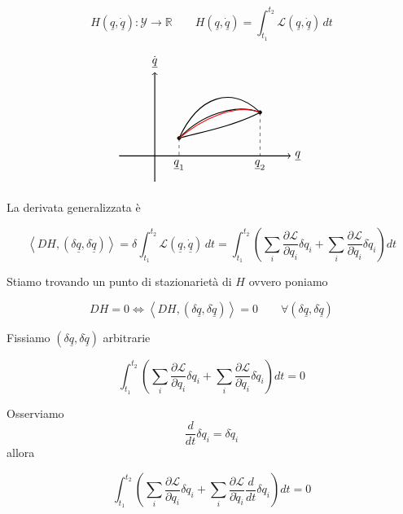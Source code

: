 \[
H(\underline{q},\dot{\underline{q}}):\mathcal{Y}\to\mathbb{R}
\qquad
H(\underline{q},\dot{\underline{q}})
=
\int_{t_1}^{t_2}\mathcal{L}(\underline{q},\dot{\underline{q}})\,dt
\]

\[
\begin{tikzpicture}[scale=1]
  \draw[->, thick] (-1.1,0) -- (4.2,0) node[right] {\(\underline{q}\)};
  \draw[->, thick] (0,-0.8) -- (0,2.6) node[above] {\(\dot{\underline{q}}\)};

  \coordinate (A) at (0.75,0.55);
  \coordinate (B) at (3.25,1.35);

  \filldraw[black] (A) circle (1.5pt);
  \filldraw[black] (B) circle (1.5pt);

  \draw[dashed] (A) -- (0.75,0);
  \draw[dashed] (B) -- (3.25,0);

  \node[below] at (0.75,0) {\(\underline{q}_1\)};
  \node[below] at (3.25,0) {\(\underline{q}_2\)};

  \draw[thick] (A) .. controls (1.35,1.85) and (2.35,2.20) .. (B);
  \draw[thick] (A) .. controls (1.40,1.25) and (2.45,1.65) .. (B);
  \draw[thick] (A) .. controls (1.25,0.70) and (2.40,0.90) .. (B);
  \draw[thick, red] (A) .. controls (1.40,1.10) and (2.45,1.65) .. (B);
\end{tikzpicture}
\]

La derivata generalizzata è

\[
\left\langle DH,(\delta\underline{q},\delta\dot{\underline{q}})\right\rangle
=
\delta \int_{t_1}^{t_2}\mathcal{L}(\underline{q},\dot{\underline{q}})\,dt
=
\int_{t_1}^{t_2}
\left(
\sum_i \frac{\partial \mathcal{L}}{\partial q_i}\delta q_i
+
\sum_i \frac{\partial \mathcal{L}}{\partial \dot{q}_i}\delta\dot{q}_i
\right)dt
\]

Stiamo trovando un punto di stazionarietà di \(H\) ovvero poniamo

\[
DH=0
\Longleftrightarrow
\left\langle DH,(\delta\underline{q},\delta\dot{\underline{q}})\right\rangle=0
\qquad
\forall(\delta\underline{q},\delta\dot{\underline{q}})
\]

Fissiamo \((\delta\underline{q},\delta\dot{\underline{q}})\) arbitrarie

\[
\int_{t_1}^{t_2}
\left(
\sum_i \frac{\partial \mathcal{L}}{\partial q_i}\delta q_i
+
\sum_i \frac{\partial \mathcal{L}}{\partial \dot{q}_i}\delta\dot{q}_i
\right)dt
=0
\]

Osserviamo
\[
\frac{d}{dt}\delta q_i=\delta\dot{q}_i
\]
allora

\[
\int_{t_1}^{t_2}
\left(
\sum_i \frac{\partial \mathcal{L}}{\partial q_i}\delta q_i
+
\sum_i \frac{\partial \mathcal{L}}{\partial \dot{q}_i}\frac{d}{dt}\delta q_i
\right)dt
=0
\]

